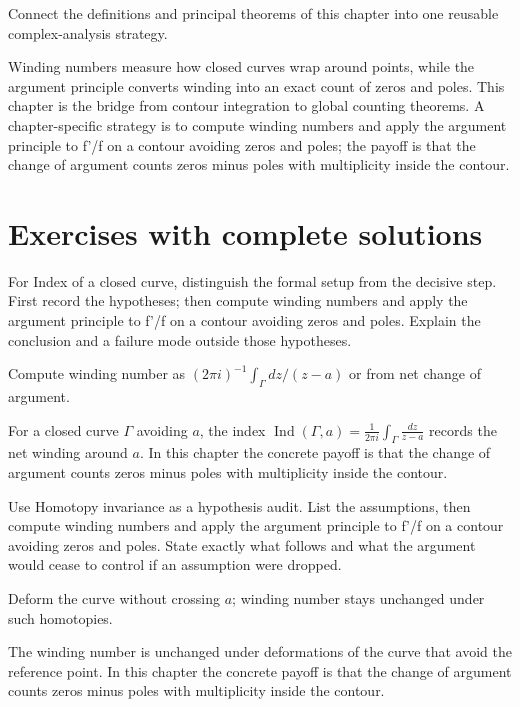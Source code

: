 \begin{problem}\label{prob:iv12-problem-12}
Connect the definitions and principal theorems of this chapter into one reusable complex-analysis strategy.
\end{problem}
\begin{solution}
Winding numbers measure how closed curves wrap around points, while the argument principle converts winding into an exact count of zeros and poles. This chapter is the bridge from contour integration to global counting theorems. A chapter-specific strategy is to compute winding numbers and apply the argument principle to f'/f on a contour avoiding zeros and poles; the payoff is that the change of argument counts zeros minus poles with multiplicity inside the contour.
\end{solution}

\section{Exercises with complete solutions}

\begin{exercise}\label{exr:iv12-01}
For Index of a closed curve, distinguish the formal setup from the decisive step. First record the hypotheses; then compute winding numbers and apply the argument principle to f'/f on a contour avoiding zeros and poles. Explain the conclusion and a failure mode outside those hypotheses.
\end{exercise}
\begin{hint}
Compute winding number as \((2\pi i)^{-1}\int_\Gamma dz/(z-a)\) or from net change of argument.
\end{hint}
\begin{solution}
For a closed curve $\Gamma$ avoiding $a$, the index $\operatorname{Ind}(\Gamma,a)=\frac{1}{2\pi i}\int_\Gamma \frac{dz}{z-a}$ records the net winding around $a$. In this chapter the concrete payoff is that the change of argument counts zeros minus poles with multiplicity inside the contour.
\end{solution}

\begin{exercise}\label{exr:iv12-02}
Use Homotopy invariance as a hypothesis audit. List the assumptions, then compute winding numbers and apply the argument principle to f'/f on a contour avoiding zeros and poles. State exactly what follows and what the argument would cease to control if an assumption were dropped.
\end{exercise}
\begin{hint}
Deform the curve without crossing \(a\); winding number stays unchanged under such homotopies.
\end{hint}
\begin{solution}
The winding number is unchanged under deformations of the curve that avoid the reference point. In this chapter the concrete payoff is that the change of argument counts zeros minus poles with multiplicity inside the contour.
\end{solution}

